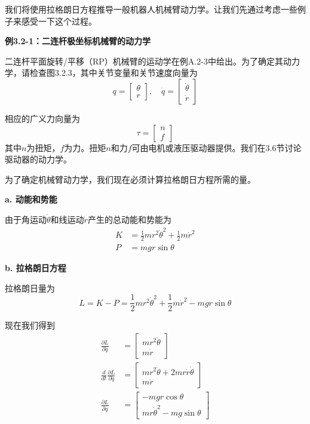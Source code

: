 \documentclass[12pt,a4paper]{ctexart}
\begin{document}
我们将使用拉格朗日方程推导一般机器人机械臂动力学。让我们先通过考虑一些例子来感受一下这个过程。

\textbf{例3.2-1：二连杆极坐标机械臂的动力学}

二连杆平面旋转/平移（RP）机械臂的运动学在例A.2-3中给出。为了确定其动力学，请检查图3.2.3，其中关节变量和关节速度向量为
\begin{equation}
q = \begin{bmatrix} \theta \\ r \end{bmatrix}, \quad \dot{q} = \begin{bmatrix} \dot{\theta} \\ \dot{r} \end{bmatrix}
\end{equation}

相应的广义力向量为
\begin{equation}
\tau = \begin{bmatrix} n \\ f \end{bmatrix}
\end{equation}
其中$n$为扭矩，$f$为力。扭矩$n$和力$f$可由电机或液压驱动器提供。我们在3.6节讨论驱动器的动力学。

为了确定机械臂动力学，我们现在必须计算拉格朗日方程所需的量。

\textbf{a. 动能和势能}

由于角运动$\dot{\theta}$和线运动$\dot{r}$产生的总动能和势能为
\begin{align}
K &= \frac{1}{2}mr^2\dot{\theta}^2 + \frac{1}{2}m\dot{r}^2 \\
P &= mgr\sin\theta
\end{align}

\textbf{b. 拉格朗日方程}

拉格朗日量为
\begin{equation}
L = K - P = \frac{1}{2}mr^2\dot{\theta}^2 + \frac{1}{2}m\dot{r}^2 - mgr\sin\theta
\end{equation}

现在我们得到
\begin{align}
\frac{\partial L}{\partial \dot{q}} &= \begin{bmatrix} mr^2\dot{\theta} \\ m\dot{r} \end{bmatrix} \\
\frac{d}{dt}\frac{\partial L}{\partial \dot{q}} &= \begin{bmatrix} mr^2\ddot{\theta} + 2mr\dot{r}\dot{\theta} \\ m\ddot{r} \end{bmatrix} \\
\frac{\partial L}{\partial q} &= \begin{bmatrix} -mgr\cos\theta \\ mr\dot{\theta}^2 - mg\sin\theta \end{bmatrix}
\end{align}
\end{document}

